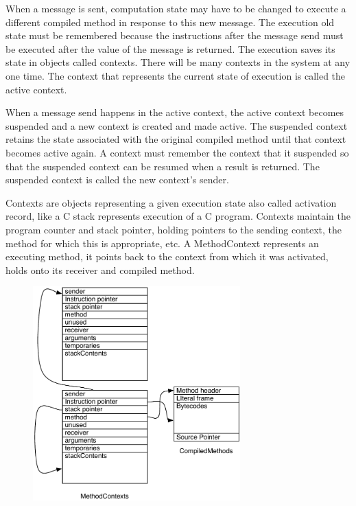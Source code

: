 \documentclass[a4paper,10pt,twoside]{book}
\begin{document}
When a message is sent, computation state may have to be changed to execute a different compiled method in response to this new message. The execution old state must be remembered because the instructions after the message send must be executed after the value of the message is returned.
The execution saves its state in objects called contexts. There will be many contexts in the system at any one time. The context that represents the current state of execution is called the active context.

When a message send happens in the active context, the active context becomes suspended and a new context is created and made active. The suspended context retains the state associated with the original compiled method until that context becomes active again. A context must remember the context that it suspended so that the suspended context can be resumed when a result is returned. The suspended context is called the new context's sender.

Contexts are objects representing a given execution state also called activation record, like a C stack represents execution of a C program. Contexts maintain the program counter and stack pointer, holding pointers to the sending context, the method for which this is appropriate, etc. A MethodContext represents an executing method, it points back to the context from which it was activated, holds onto its receiver and compiled method.

\begin{figure}
\begin{center}
\includegraphics[width=8cm]{MethodAndMethodContext}
\end{center}
\end{figure}

\end{document}

